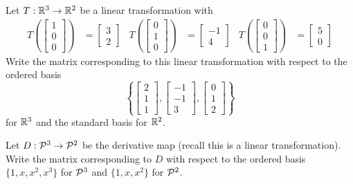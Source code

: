 \begin{applicationActivities}{1}{17}
\begin{activity}{10}
  Let $T: \IR^3 \rightarrow \IR^2$ be a linear transformation with
\begin{align*}
T\left(\begin{bmatrix} 1 \\ 0 \\ 0 \end{bmatrix} \right) &= \begin{bmatrix} 3 \\ 2\end{bmatrix} &
T\left(\begin{bmatrix} 0 \\ 1 \\ 0 \end{bmatrix} \right) &= \begin{bmatrix} -1 \\ 4\end{bmatrix} &
T\left(\begin{bmatrix} 0 \\ 0 \\ 1 \end{bmatrix} \right) &= \begin{bmatrix} 5 \\ 0\end{bmatrix}
\end{align*}
Write the matrix corresponding to this linear transformation with respect to the ordered basis
\[\left\{ \begin{bmatrix} 2 \\ 1 \\ 1 \end{bmatrix} , \begin{bmatrix} -1 \\ -1 \\ 3 \end{bmatrix} , \begin{bmatrix} 0 \\ 1 \\ 2 \end{bmatrix} \right\}\] for $\IR^3$ and the standard basis for $\IR^2$.
\end{activity}

\begin{activity}{5}
Let $D: \P^3 \rightarrow \P^2$ be the derivative map (recall this is a linear transformation).  Write the matrix corresponding to $D$ with respect to the ordered basis $\{1,x,x^2,x^3\}$ for $\P^3$ and $\{1,x,x^2\}$ for $\P^2$.
\end{activity}

\end{applicationActivities}
